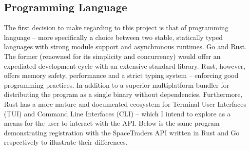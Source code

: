 \subsection{Programming Language}
The first decision to make regarding to this project is that of programming language – more specifically a choice between two stable, statically typed languages with strong module support and asynchronous runtimes. Go and Rust. The former (renowned for its simplicity and concurrency) would offer an expediated development cycle with an extensive standard library. Rust, however, offers memory safety, performance and a strict typing system – enforcing good programming practices. In addition to a superior multiplatform bundler for distributing the program as a single binary without dependencies. Furthermore, Rust has a more mature and documented ecosystem for Terminal User Interfaces (TUI) and Command Line Interfaces (CLI) – which I intend to explore as a means for the user to interact with the API. Below is the same program demonstrating registration with the SpaceTraders API written in Rust and Go respectively to illustrate their differences. 

